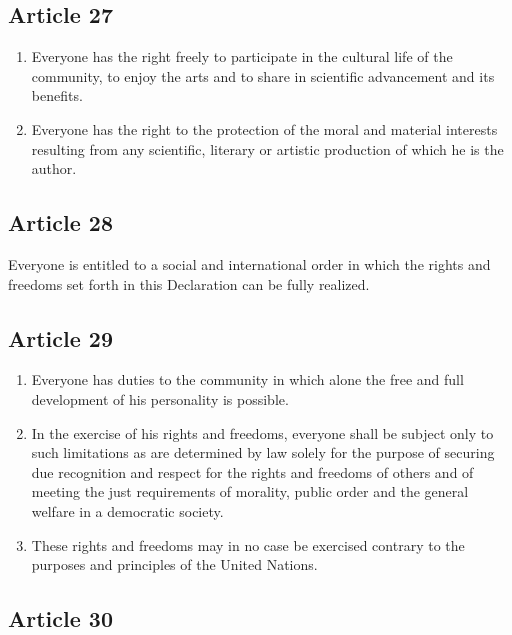 \documentclass[
  titlepage,
  openright,
  DIV=calc,
  toc=listof,
  listof=nochaptergap]{scrbook}
\begin{document}
\hypertarget{article-27}{%
\subsection{Article 27}\label{article-27}}

\begin{enumerate}
\def\labelenumi{\arabic{enumi}.}
\item
  Everyone has the right freely to participate in the cultural life of
  the community, to enjoy the arts and to share in scientific
  advancement and its benefits.
\item
  Everyone has the right to the protection of the moral and material
  interests resulting from any scientific, literary or artistic
  production of which he is the author.
\end{enumerate}

\hypertarget{article-28}{%
\subsection{Article 28}\label{article-28}}

Everyone is entitled to a social and international order in which the
rights and freedoms set forth in this Declaration can be fully realized.

\hypertarget{article-29}{%
\subsection{Article 29}\label{article-29}}

\begin{enumerate}
\def\labelenumi{\arabic{enumi}.}
\item
  Everyone has duties to the community in which alone the free and full
  development of his personality is possible.
\item
  In the exercise of his rights and freedoms, everyone shall be subject
  only to such limitations as are determined by law solely for the
  purpose of securing due recognition and respect for the rights and
  freedoms of others and of meeting the just requirements of morality,
  public order and the general welfare in a democratic society.
\item
  These rights and freedoms may in no case be exercised contrary to the
  purposes and principles of the United Nations.
\end{enumerate}

\hypertarget{article-30}{%
\subsection{Article 30}\label{article-30}}
\end{document}
